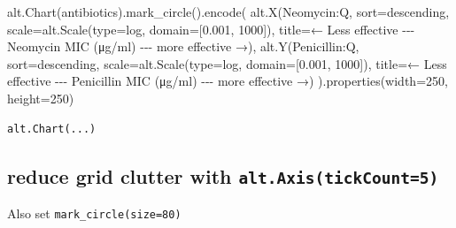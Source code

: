 \documentclass[
  letterpaper,
  DIV=11,
  numbers=noendperiod]{scrartcl}
\newenvironment{Shaded}{\begin{snugshade}}{\end{snugshade}}
\newcommand{\BuiltInTok}[1]{\textcolor[rgb]{0.00,0.23,0.31}{#1}}
\newcommand{\DecValTok}[1]{\textcolor[rgb]{0.68,0.00,0.00}{#1}}
\newcommand{\FloatTok}[1]{\textcolor[rgb]{0.68,0.00,0.00}{#1}}
\newcommand{\NormalTok}[1]{\textcolor[rgb]{0.00,0.23,0.31}{#1}}
\newcommand{\OperatorTok}[1]{\textcolor[rgb]{0.37,0.37,0.37}{#1}}
\newcommand{\StringTok}[1]{\textcolor[rgb]{0.13,0.47,0.30}{#1}}
\begin{document}
\begin{Shaded}
\begin{Highlighting}[]
\NormalTok{alt.Chart(antibiotics).mark\_circle().encode(}
\NormalTok{    alt.X(}\StringTok{\textquotesingle{}Neomycin:Q\textquotesingle{}}\NormalTok{,}
\NormalTok{          sort}\OperatorTok{=}\StringTok{\textquotesingle{}descending\textquotesingle{}}\NormalTok{,}
\NormalTok{          scale}\OperatorTok{=}\NormalTok{alt.Scale(}\BuiltInTok{type}\OperatorTok{=}\StringTok{\textquotesingle{}log\textquotesingle{}}\NormalTok{, domain}\OperatorTok{=}\NormalTok{[}\FloatTok{0.001}\NormalTok{, }\DecValTok{1000}\NormalTok{]),}
\NormalTok{          title}\OperatorTok{=}\StringTok{\textquotesingle{}← Less effective {-}{-}{-} Neomycin MIC (μg/ml) {-}{-}{-} more effective →\textquotesingle{}}\NormalTok{),}
\NormalTok{    alt.Y(}\StringTok{\textquotesingle{}Penicillin:Q\textquotesingle{}}\NormalTok{,}
\NormalTok{          sort}\OperatorTok{=}\StringTok{\textquotesingle{}descending\textquotesingle{}}\NormalTok{,}
\NormalTok{          scale}\OperatorTok{=}\NormalTok{alt.Scale(}\BuiltInTok{type}\OperatorTok{=}\StringTok{\textquotesingle{}log\textquotesingle{}}\NormalTok{, domain}\OperatorTok{=}\NormalTok{[}\FloatTok{0.001}\NormalTok{, }\DecValTok{1000}\NormalTok{]),}
\NormalTok{          title}\OperatorTok{=}\StringTok{\textquotesingle{}← Less effective {-}{-}{-} Penicillin MIC (μg/ml) {-}{-}{-} more effective →\textquotesingle{}}\NormalTok{)}
\NormalTok{).properties(width}\OperatorTok{=}\DecValTok{250}\NormalTok{, height}\OperatorTok{=}\DecValTok{250}\NormalTok{)}
\end{Highlighting}
\end{Shaded}

\begin{verbatim}
alt.Chart(...)
\end{verbatim}

\subsection{\texorpdfstring{reduce grid clutter with
\texttt{alt.Axis(tickCount=5)}}{reduce grid clutter with alt.Axis(tickCount=5)}}\label{reduce-grid-clutter-with-alt.axistickcount5}

Also set \texttt{mark\_circle(size=80)}
\end{document}
